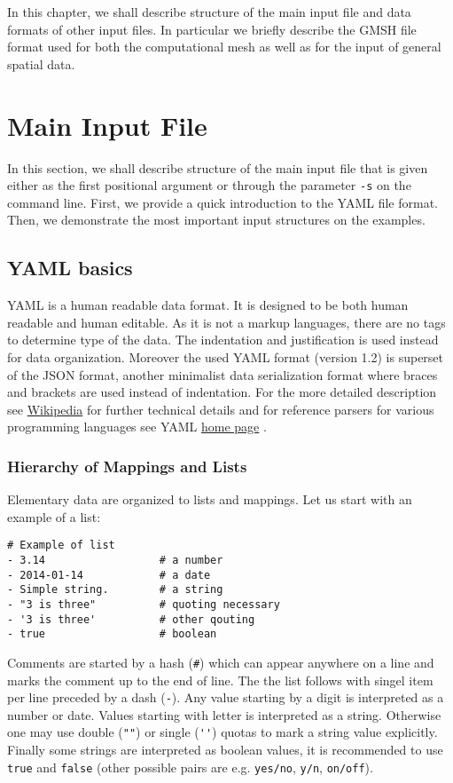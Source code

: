 
In this chapter, we shall describe structure of the main input file and data formats of other input files.
In particular we briefly describe the GMSH file format used for both the computational mesh as well as for the input of general spatial data.


\section{Main Input File}
\label{sec:CONformat}

In this section, we shall describe structure of the main input file that is given either as the first positional argument or through 
the parameter \verb'-s' on the command line. First, we provide a quick introduction to the YAML file format. Then, we demonstrate the most important 
input structures on the examples. 







\subsection{YAML basics}
YAML is a human readable data format. It is designed to be both human readable and human editable. As it is not a markup languages, there are
no tags to determine type of the data. The indentation and justification is used instead for data organization. Moreover the used YAML format (version 1.2) is 
superset of the JSON format, another minimalist data serialization format where braces and brackets are used instead of indentation.
For the more detailed description see \href{https://en.wikipedia.org/wiki/YAML}{Wikipedia} 
for further technical details and for reference parsers for various programming languages see YAML \href{http://yaml.org/}{home page} .

\subsubsection{Hierarchy of Mappings and Lists}
Elementary data are organized to lists and mappings. Let us start with an example of a list:
\begin{verbatim}
# Example of list 
- 3.14                  # a number
- 2014-01-14            # a date
- Simple string.        # a string
- "3 is three"          # quoting necessary
- '3 is three'          # other qouting
- true                  # boolean
\end{verbatim}
Comments are started by a hash (\verb'#') which can appear anywhere on a line and marks the comment up to the end of line.
The the list follows with singel item per line preceded by a dash (\verb'-'). Any value starting by a digit is interpreted as a number
or date. Values starting with letter is interpreted as a string. Otherwise one may use double (\verb'""') or single (\verb"''") 
quotas to mark a string value explicitly. Finally some strings are interpreted as boolean values, it is recommended to use 
\verb'true' and \verb'false' (other possible pairs are e.g. \verb'yes/no', \verb'y/n', \verb'on/off'). 

